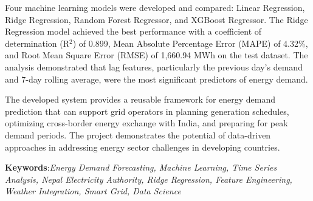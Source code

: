 		Four machine learning models were developed and compared: Linear Regression, Ridge Regression, Random Forest Regressor, and XGBoost Regressor. The Ridge Regression model achieved the best performance with a coefficient of determination (R$^2$) of 0.899, Mean Absolute Percentage Error (MAPE) of 4.32\%, and Root Mean Square Error (RMSE) of 1,660.94 MWh on the test dataset. The analysis demonstrated that lag features, particularly the previous day's demand and 7-day rolling average, were the most significant predictors of energy demand.

		The developed system provides a reusable framework for energy demand prediction that can support grid operators in planning generation schedules, optimizing cross-border energy exchange with India, and preparing for peak demand periods. The project demonstrates the potential of data-driven approaches in addressing energy sector challenges in developing countries.

        \vspace{1cm}
		\textbf{Keywords}:\textit{Energy Demand Forecasting, Machine Learning, Time Series Analysis, Nepal Electricity Authority, Ridge Regression, Feature Engineering, Weather Integration, Smart Grid, Data Science}

		\break

		\tableofcontents

		\break
		\pagebreak

		\listoffigures
		\break

        \Large
            \begingroup
                \let\clearpage\relax
